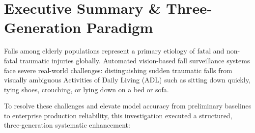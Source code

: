 \documentclass[11pt,a4paper]{article}
\begin{document}
\noindent
{}

\vspace{1.2em}

\section{Executive Summary \& Three-Generation Paradigm}

Falls among elderly populations represent a primary etiology of fatal and non-fatal traumatic injuries globally. Automated vision-based fall surveillance systems face severe real-world challenges: distinguishing sudden traumatic falls from visually ambiguous Activities of Daily Living (ADL) such as sitting down quickly, tying shoes, crouching, or lying down on a bed or sofa.

To resolve these challenges and elevate model accuracy from preliminary baselines to enterprise production reliability, this investigation executed a structured, three-generation systematic enhancement:
\end{document}
